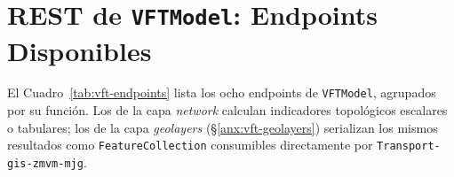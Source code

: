 
\section{\api{} REST de \texorpdfstring{\texttt{VFTModel}}{VFTModel}: Endpoints Disponibles}
\label{anx:vft-api}

El Cuadro~\ref{tab:vft-endpoints} lista los ocho endpoints de \texttt{VFTModel},
agrupados por su función. Los de la capa \textit{network} calculan indicadores
topológicos escalares o tabulares; los de la capa \textit{geolayers}
(§\ref{anx:vft-geolayers}) serializan los mismos resultados como
\texttt{FeatureCollection} consumibles directamente por \texttt{Transport-gis-zmvm-mjg}.

